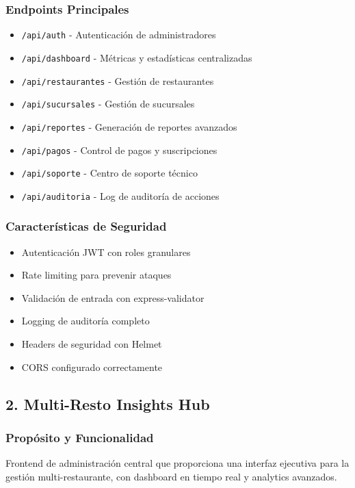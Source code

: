 \documentclass[12pt,a4paper]{article}
\begin{document}
\subsubsection{Endpoints Principales}
\begin{itemize}
    \item \texttt{/api/auth} - Autenticación de administradores
    \item \texttt{/api/dashboard} - Métricas y estadísticas centralizadas
    \item \texttt{/api/restaurantes} - Gestión de restaurantes
    \item \texttt{/api/sucursales} - Gestión de sucursales
    \item \texttt{/api/reportes} - Generación de reportes avanzados
    \item \texttt{/api/pagos} - Control de pagos y suscripciones
    \item \texttt{/api/soporte} - Centro de soporte técnico
    \item \texttt{/api/auditoria} - Log de auditoría de acciones
\end{itemize}

\subsubsection{Características de Seguridad}
\begin{itemize}
    \item Autenticación JWT con roles granulares
    \item Rate limiting para prevenir ataques
    \item Validación de entrada con express-validator
    \item Logging de auditoría completo
    \item Headers de seguridad con Helmet
    \item CORS configurado correctamente
\end{itemize}

\subsection{2. Multi-Resto Insights Hub}

\subsubsection{Propósito y Funcionalidad}
Frontend de administración central que proporciona una interfaz ejecutiva para la gestión multi-restaurante, con dashboard en tiempo real y analytics avanzados.
\end{document}
